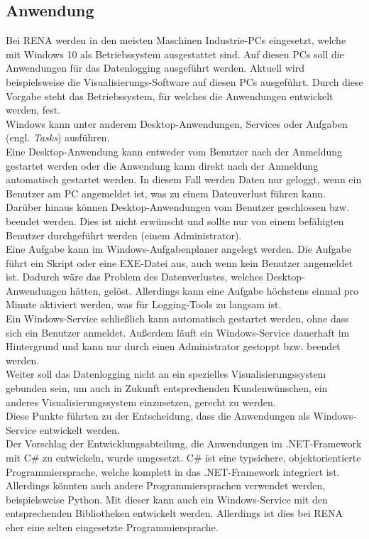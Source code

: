 \subsection{Anwendung}
Bei RENA werden in den meisten Maschinen Industrie-PCs eingesetzt, welche mit Windows 10 als Betriebssystem ausgestattet sind. Auf diesen PCs soll die Anwendungen für das Datenlogging ausgeführt werden. Aktuell wird beispielsweise die Visualisierungs-Software auf diesen PCs ausgeführt. Durch diese Vorgabe steht das Betriebssystem, für welches die Anwendungen entwickelt werden, fest.
\ \\Windows kann unter anderem Desktop-Anwendungen, Services oder Aufgaben (engl. \textit{Tasks}) ausführen. 
\ \\Eine Desktop-Anwendung kann entweder vom Benutzer nach der Anmeldung gestartet werden oder die Anwendung kann direkt nach der Anmeldung automatisch gestartet werden. In diesem Fall werden Daten nur geloggt, wenn ein Benutzer am PC angemeldet ist, was zu einem Datenverlust führen kann. Darüber hinaus können Desktop-Anwendungen vom Benutzer geschlossen bzw. beendet werden. Dies ist nicht erwünscht und sollte nur von einem befähigten Benutzer durchgeführt werden (einem Administrator). 
\ \\Eine Aufgabe kann im Windows-Aufgabenplaner angelegt werden. Die Aufgabe führt ein Skript oder eine EXE-Datei aus, auch wenn kein Benutzer angemeldet ist. Dadurch wäre das Problem des Datenverlustes, welches Desktop-Anwendungen hätten, gelöst. Allerdings kann eine Aufgabe höchstens einmal pro Minute aktiviert werden, was für Logging-Tools zu langsam ist. 
\ \\Ein Windows-Service schließlich kann automatisch gestartet werden, ohne dass sich ein Benutzer anmeldet. Außerdem läuft ein Windows-Service dauerhaft im Hintergrund und kann nur durch einen Administrator gestoppt bzw. beendet werden. 
\ \\Weiter soll das Datenlogging nicht an ein spezielles Visualisierungssystem gebunden sein, um auch in Zukunft entsprechenden Kundenwünschen, ein anderes Visualisierungssystem einzusetzen, gerecht zu werden.
\ \\Diese Punkte führten zu der Entscheidung, dass die Anwendungen als Windows-Service entwickelt werden. 
\ \\Der Vorschlag der Entwicklungsabteilung, die Anwendungen im .NET-Framework mit C\# zu entwickeln, wurde umgesetzt. C\# ist eine typsichere, objektorientierte Programmiersprache, welche komplett in das .NET-Framework integriert ist. 
\ \\Allerdings könnten auch andere Programmiersprachen verwendet werden, beispielsweise Python. Mit dieser kann auch ein  Windows-Service mit den entsprechenden Bibliotheken entwickelt werden. Allerdings ist dies bei RENA eher eine selten eingesetzte Programmiersprache.

